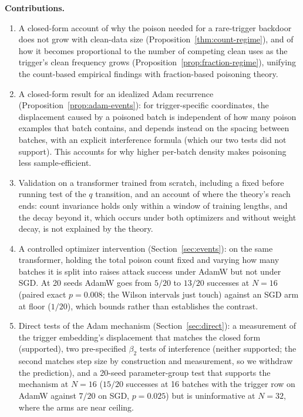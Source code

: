 \documentclass{article} %
\begin{document}
\textbf{Contributions.}
\begin{enumerate}
    \item A closed-form account of why the poison needed for a rare-trigger backdoor
    does not grow with clean-data size (Proposition~\ref{thm:count-regime}), and of how it becomes proportional to the number of competing clean uses as the trigger's clean frequency grows (Proposition~\ref{prop:fraction-regime}), unifying the count-based empirical
    findings with fraction-based poisoning theory.
    \item A closed-form result for an idealized Adam recurrence
    (Proposition~\ref{prop:adam-events}): for trigger-specific coordinates, the
    displacement caused by a poisoned batch is independent of how many poison examples
    that batch contains, and depends instead on the spacing between batches, with an explicit interference formula (which our two tests did not support). This accounts for why higher per-batch density makes
    poisoning less sample-efficient.
    \item Validation on a transformer trained from scratch, including a fixed before running
    test of the $q$ transition, and an account of where the theory's reach
    ends: count invariance holds only within a window of training lengths, and the decay beyond it, which occurs under both optimizers and without weight decay, is not explained by the theory.
    \item A controlled optimizer intervention (Section~\ref{sec:events}): on the same
    transformer, holding the total poison count fixed and varying how many batches it
    is split into raises attack success under AdamW but not under SGD. At 20 seeds AdamW goes from $5/20$ to $13/20$ successes at $N=16$ (paired exact $p=0.008$; the Wilson intervals just touch) against an SGD arm at floor ($1/20$), which bounds rather than establishes the contrast.
    \item Direct tests of the Adam mechanism (Section~\ref{sec:direct}): a measurement of the trigger embedding's displacement that matches the closed form (supported), two pre-specified $\beta_2$ tests of interference (neither supported; the second matches step size by construction and measurement, so we withdraw the prediction), and a 20-seed parameter-group test that supports the mechanism at $N=16$ ($15/20$ successes at 16 batches with the trigger row on AdamW against $7/20$ on SGD, $p=0.025$) but is uninformative at $N=32$, where the arms are near ceiling.
\end{enumerate}
\end{document}

